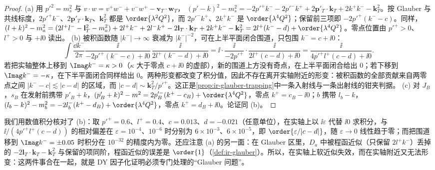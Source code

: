 \begin{proof}
(a) 用 $p'^2=m_s^2$ 与 $v\cdot w=v^+w^-+v^-w^+-\mathbf v_T\cdot\mathbf w_T$，
$(p'-k)^2-m_s^2=-2p'^+k^--2p'^-k^++2\mathbf p'_T\cdot\mathbf k_T+2k^+k^--\mathbf k_T^2$。按 Glauber 与共线标度，$2p'^+k^-$、$2\mathbf p'_T\cdot\mathbf k_T$、$\mathbf k_T^2$ 都是 $\order{\lambda^2Q^2}$，而 $2p'^-k^+$、$2k^+k^-$ 是 $\order{\lambda^4Q^2}$；保留前三项即 $-2p'^+(k^--c)$。同样，$(l+k)^2-m_a^2=(2l^+l^--\mathbf l_T^2-m_a^2)+2l^+k^-+2l^-k^+-2\mathbf l_T\cdot\mathbf k_T+2k^+k^--\mathbf k_T^2=2l^+(k^--d)+\order{\lambda^4Q^2}$。零点位置由 $p'^+>0$、$l^+>0$ 与 $+\ii0$ 读出。
(b) 被积函数随 $|k^-|\to\infty$ 衰减为 $|k^-|^{-2}$，可在上半平面闭合围道，只包围 $k^-=c+\ii0$：
\[
\int\frac{\dd k^-}{2\pi}\frac{\ii}{-2p'^+(k^--c)+\ii0}\,\frac{\ii}{2l^+(k^--d)+\ii0}
=\ii\cdot\frac{\ii}{-2p'^+}\cdot\frac{\ii}{2l^+(c-d)+\ii0}=\frac{\ii}{4p'^+l^+(c-d)+\ii0}.
\]
若把实轴整体上移到 $\Imag k^-=\kappa>0$（$\kappa$ 大于零点 $c+\ii0$ 的虚部），新的围道上方没有奇点，在上半平面闭合给出 $0$；若下移到 $\Imag k^-=-\kappa$，在下半平面闭合同样给出 $0$。两种形变都改变了积分值，因此不存在离开实轴附近的形变：被积函数的全部贡献来自两零点之间 $|k^--c|\lesssim|c-d|$ 的区域，而 $|c-d|\sim\mathbf k_T^2/p'^+$。这正是\cref{prop:ir-glauber-trapping}中一条入射线与一条出射线的钳夹判据。
(c) 对 $J_B$，$s_B$ 在发射前携带 $p'_B+k$，$(p'_B+k)^2-m^2=2p'^-_B(k^+-c_B)+\order{\lambda^4Q^2}$，零点 $k^+=c_B-\ii0$；$b$ 携带 $l_b-k$，$(l_b-k)^2-m_b^2=-2l_b^-(k^+-d_B)+\order{\lambda^4Q^2}$，零点 $k^+=d_B+\ii0$。论证同 (b)。
\end{proof}

我们用数值积分核对了 (b)：取 $p'^+=0.6$、$l^+=0.4$、$c=0.013$、$d=-0.021$（任意单位），在实轴上以 $\ii\varepsilon$ 代替 $\ii0$ 求积分，与 $\ii/(4p'^+l^+(c-d))$ 的相对偏差在 $\varepsilon=10^{-4}$、$10^{-6}$ 时分别为 $6\times10^{-3}$、$6\times10^{-5}$，即 $\order{\varepsilon/|c-d|}$，随 $\varepsilon\to0$ 线性趋于零；而把围道移到 $\Imag k^-=\pm0.05$ 时积分在 $10^{-32}$ 的精度内为零。还应注意 (a) 的另一面：在 Glauber 区里，$D_a$ 中被程函近似（只保留 $2l^+k^-$）丢掉的 $-2\mathbf l_T\cdot\mathbf k_T-\mathbf k_T^2$ 与保留的项同阶，程函近似的误差是 $\order{1}$（\cref{def:ir-glauber}）。所以，在实轴上软近似失效，而在实轴附近又无法形变：这两件事合在一起，就是 DY 因子化证明必须专门处理的“Glauber 问题”。
